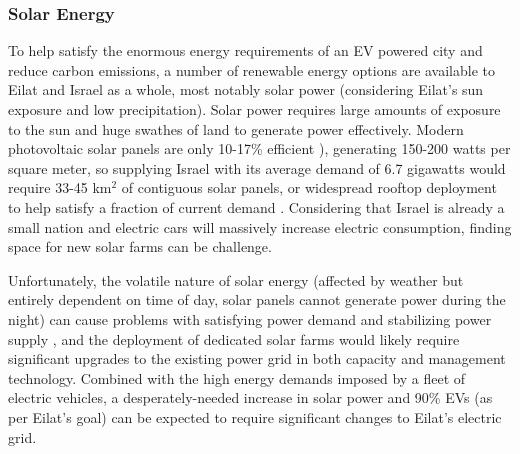 \documentclass[12pt]{article}                         %
\begin{document}
\subsubsection{Solar Energy}
To help satisfy the enormous energy requirements of an EV powered city and reduce carbon emissions, a number of renewable energy options are available to Eilat and Israel as a whole, most notably solar power (considering Eilat's sun exposure and low precipitation). Solar power requires large amounts of exposure to the sun and huge swathes of land to generate power effectively. Modern photovoltaic solar panels are only 10-17\% efficient \cite{Zhu2015DistributedGrid}), generating 150-200 watts per square meter, so supplying Israel with its average demand of 6.7 gigawatts would require 33-45 km$^2$ of contiguous solar panels, or widespread rooftop deployment to help satisfy a fraction of current demand \cite{Vardimon2011AssessmentIsrael}. Considering that Israel is already a small nation and electric cars will massively increase electric consumption, finding space for new solar farms can be challenge.

Unfortunately, the volatile nature of solar energy (affected by weather but entirely dependent on time of day, solar panels cannot generate power during the night) can cause problems with satisfying power demand and stabilizing power supply \cite{Lu2015IntroductionPEVs}, and the deployment of dedicated solar farms would likely require significant upgrades to the existing power grid \cite{Vardimon2011AssessmentIsrael} in both capacity and management technology. Combined with the high energy demands imposed by a fleet of electric vehicles, a desperately-needed increase in solar power and 90\% EVs (as per Eilat's goal) can be expected to require significant changes to Eilat's electric grid.
\end{document}
